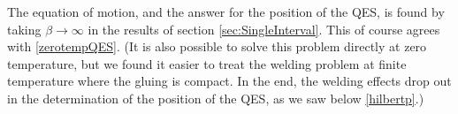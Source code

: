 The equation of motion, and the answer for the position of the QES, is found by taking $\beta \to \infty$ in the results of section \ref{sec:SingleInterval}. This of course agrees with \eqref{zerotempQES}. (It is also possible to solve this problem directly at zero temperature, but we found it easier to treat the welding problem at finite temperature where the gluing is compact. In the end, the welding effects drop out in the determination of the position of the QES, as we saw below \eqref{hilbertp}.)







